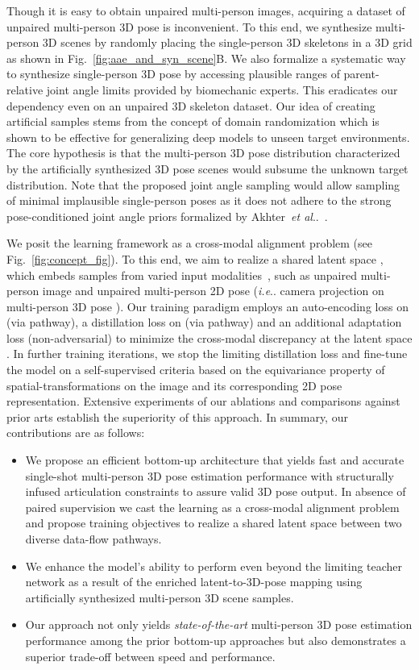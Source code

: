 \documentclass[runningheads]{llncs}
\makeatletter
\DeclareRobustCommand\onedot{\futurelet\@let@token\@onedot}
\def\@onedot{\ifx\@let@token.\else.\null\fi\xspace}
\def\ie{\emph{i.e}\onedot} \def\Ie{\emph{I.e}\onedot}
\def\etal{\emph{et al}\onedot}
\makeatother
\begin{document}
Though it is easy to obtain unpaired multi-person images, acquiring a dataset of unpaired multi-person 3D pose is inconvenient. To this end, we synthesize multi-person 3D scenes by randomly placing the single-person 3D skeletons in a 3D grid as shown in Fig.~\ref{fig:aae_and_syn_scene}{\color{red}B}. We also formalize a systematic way to synthesize single-person 3D pose by accessing plausible ranges of parent-relative joint angle limits provided by biomechanic experts. This eradicates our dependency even on an unpaired 3D skeleton dataset. Our idea of creating artificial samples stems from the concept of domain randomization \cite{peng2018sim,tobin2017domain} which is shown to be effective for generalizing deep models to unseen target environments. The core hypothesis is that the multi-person 3D pose distribution characterized by the artificially synthesized 3D pose scenes would subsume the unknown target distribution. Note that the proposed joint angle sampling would allow sampling of minimal implausible single-person poses as it does not adhere to the strong pose-conditioned joint angle priors formalized by Akhter~\etal~\cite{akhter2015pose}.


We posit the learning framework as a cross-modal alignment problem (see Fig.~\ref{fig:concept_fig}). To this end, we aim to realize a shared latent space , which embeds samples from varied input modalities~\cite{chung2018unsupervised}, such as unpaired multi-person image  and unpaired multi-person 2D pose  (\ie camera projection on multi-person 3D pose ). Our training paradigm employs an auto-encoding loss on  (via  pathway), a distillation loss on   (via  pathway) and an additional adaptation loss (non-adversarial) to minimize the cross-modal discrepancy at the latent space . In further training iterations, we stop the limiting distillation loss and fine-tune the model on a self-supervised criteria based on the equivariance property \cite{schmidt2012learning} of spatial-transformations on the image and its corresponding 2D pose representation. Extensive experiments of our ablations and comparisons against prior arts establish the superiority of this approach. In summary, our contributions are as follows:
\begin{itemize}
    \item We propose an efficient bottom-up architecture that yields fast and accurate single-shot multi-person 3D pose estimation performance with structurally infused articulation constraints to assure valid 3D pose output. In absence of paired supervision we cast the learning as a cross-modal alignment problem and propose training objectives to realize a shared latent space between two diverse data-flow pathways.
    \item We enhance the model's ability to perform even beyond the limiting teacher network as a result of the enriched latent-to-3D-pose mapping using artificially synthesized multi-person 3D scene samples.
    \item Our approach not only yields \textit{state-of-the-art} multi-person 3D pose estimation performance among the prior bottom-up approaches but also demonstrates a superior trade-off between speed and performance.
\end{itemize}
\end{document}
